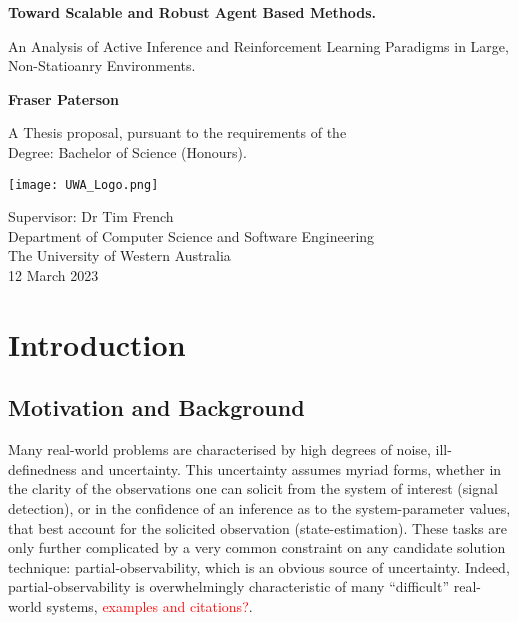 \documentclass[12pt, twoside]{report}
\begin{document}
\begin{titlepage}
	\begin{center}
	
	\vspace*{0.5cm}
	
	\Huge
	\textbf{Toward Scalable and Robust Agent Based Methods.}
	
	\vspace{0.5cm}
	\Large
	An Analysis of Active Inference and Reinforcement Learning Paradigms in Large, Non-Statioanry Environments.
	
	\vspace{1.5cm}

	\textbf{Fraser Paterson}

	\vspace{1.5cm}

	A Thesis proposal, pursuant to the requirements of the\\ 
	Degree: Bachelor of Science (Honours).  
	
	\vspace{2.0cm}

	\texttt{[image: UWA\_Logo.png]}
	
	\vspace{2.0cm}	
	
	\Large
	Supervisor: Dr Tim French\\ 
	Department of Computer Science and Software Engineering\\
	The University of Western Australia\\
	12 March 2023
	
	\end{center}
\end{titlepage}


\tableofcontents

\cleardoublepage



\section{Introduction}

\subsection{Motivation and Background}
Many real-world problems are characterised by high degrees of noise, ill-definedness and uncertainty. This uncertainty assumes myriad forms, whether in the clarity of the observations one can solicit from the system of interest (signal detection), or in the confidence of an inference as to the system-parameter values, that best account for the solicited observation (state-estimation). These tasks are only further complicated by a very common constraint on any candidate solution technique: partial-observability, which is an obvious source of uncertainty. Indeed, partial-observability is overwhelmingly characteristic of many ``difficult'' real-world systems, \textcolor{red}{examples and citations?}. 
\\
\end{document}
